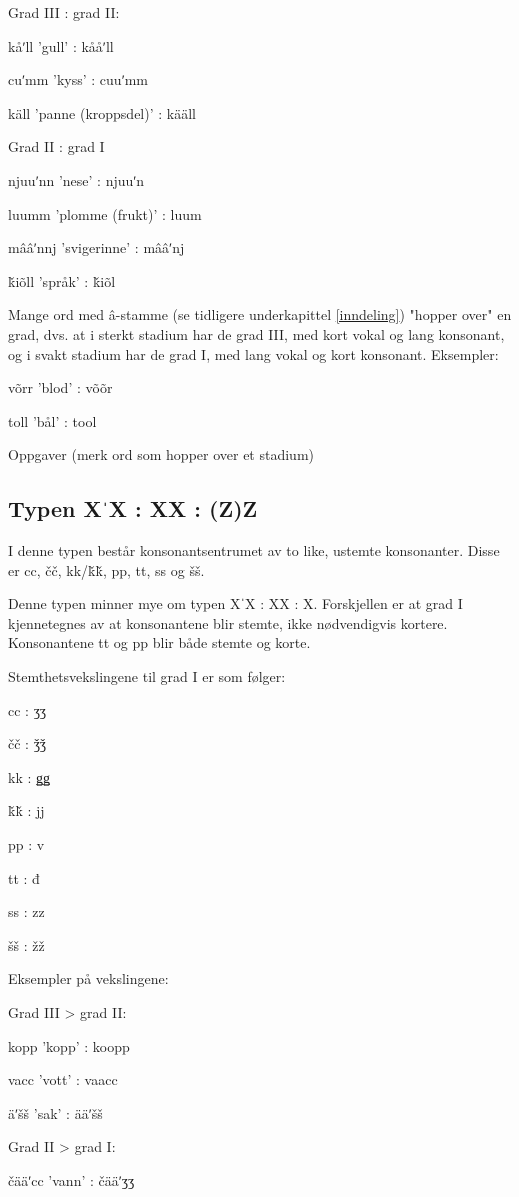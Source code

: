 Grad III : grad II:

kåʹll 'gull' : kååʹll

cuʹmm 'kyss' : cuuʹmm

käll 'panne (kroppsdel)' : kääll

Grad II : grad I

njuuʹnn 'nese' : njuuʹn

luumm 'plomme (frukt)' : luum

mââʹnnj 'svigerinne' : mââʹnj

ǩiõll 'språk' : ǩiõl

Mange ord med â-stamme (se tidligere underkapittel \ref{inndeling}) "hopper over" en grad, dvs. at i sterkt stadium har de grad III, med kort vokal og lang konsonant, og i svakt stadium har de grad I, med lang vokal og kort konsonant. Eksempler:

võrr 'blod' : võõr

toll 'bål' : tool

Oppgaver (merk ord som hopper over et stadium)

\subsection{Typen XˈX : XX : (Z)Z}

I denne typen består konsonantsentrumet av to like, ustemte konsonanter. Disse er cc, čč, kk/ǩǩ, pp, tt, ss og šš.

Denne typen minner mye om typen XˈX : XX : X. Forskjellen er at grad I kjennetegnes av at konsonantene blir stemte, ikke nødvendigvis kortere. Konsonantene tt og pp blir både stemte og korte.

Stemthetsvekslingene til grad I er som følger:

cc : ʒʒ

čč : ǯǯ

kk : ǥǥ

ǩǩ : jj

pp : v

tt : đ

ss : zz

šš : žž

Eksempler på vekslingene:

Grad III > grad II:

kopp 'kopp' : koopp

vacc 'vott' : vaacc

äʹšš 'sak' : ääʹšš

Grad II > grad I:

čääʹcc 'vann' : čääʹʒʒ

